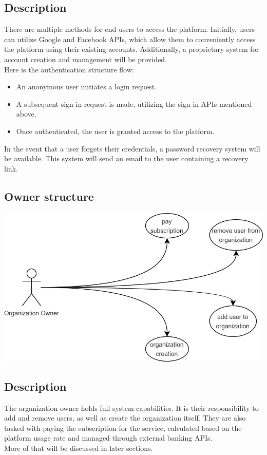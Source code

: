 \documentclass{article}
\begin{document}
\subsection*{Description}
There are multiple methods for end-users to access the platform. Initially, users can utilize Google and Facebook APIs, which allow them to conveniently access the platform using their existing accounts. Additionally, a proprietary system for account creation and management will be provided.\\
Here is the authentication structure flow:
\begin{itemize}
    \item  An anonymous user initiates a login request.
    \item A subsequent sign-in request is made, utilizing the sign-in APIs mentioned above.
    \item  Once authenticated, the user is granted access to the platform.
\end{itemize}
In the event that a user forgets their credentials, a password recovery system will be available. This system will send an email to the user containing a recovery link.
\subsection{Owner structure}
\includegraphics[width=\textwidth, keepaspectratio]{images/UseCaseDiagram/UseCaseOwner.jpg}
\subsection*{Description}
The organization owner holds full system capabilities. It is their responsibility to add and remove users, as well as create the organization itself. They are also tasked with paying the subscription for the service, calculated based on the platform usage rate and managed through external banking APIs.\\
More of that will be discussed in later sections.
\end{document}
